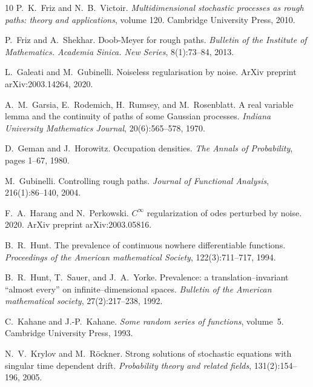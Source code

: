\documentclass[10pt]{article}
\newcommand{\tmtextit}[1]{{\itshape{#1}}}
\begin{document}
\begin{thebibliography}{10}
  P.~K.~Friz  and  N.~B.~Victoir.
  {\newblock}\tmtextit{Multidimensional stochastic processes as rough paths:
  theory and applications},  volume  120. {\newblock}Cambridge University
  Press, 2010.{\newblock}
  
  P.~Friz  and  A.~Shekhar. {\newblock}Doob-Meyer
  for rough paths. {\newblock}\tmtextit{Bulletin of the Institute of
  Mathematics. Academia Sinica. New Series}, 8(1):73--84, 2013.{\newblock}
  
  L.~Galeati  and  M.~Gubinelli.
  {\newblock}Noiseless regularisation by noise. {\newblock}ArXiv preprint
  arXiv:2003.14264, 2020.{\newblock}
  
  A.~M.~Garsia, E.~Rodemich, H.~Rumsey, and 
  M.~Rosenblatt. {\newblock}A real variable lemma and the continuity of paths
  of some Gaussian processes. {\newblock}\tmtextit{Indiana University
  Mathematics Journal}, 20(6):565--578, 1970.{\newblock}
  
  D.~Geman  and  J.~Horowitz. {\newblock}Occupation
  densities. {\newblock}\tmtextit{The Annals of Probability},  pages  1--67,
  1980.{\newblock}
  
  M.~Gubinelli. {\newblock}Controlling rough paths.
  {\newblock}\tmtextit{Journal of Functional Analysis}, 216(1):86--140,
  2004.{\newblock}
  
  F.~A.~Harang  and  N.~Perkowski.
  {\newblock}$C^{\infty}$ regularization of odes perturbed by noise.
  {\newblock}2020. {\newblock}ArXiv preprint arXiv:2003.05816.{\newblock}
  
  B.~R.~Hunt. {\newblock}The prevalence of continuous
  nowhere differentiable functions. {\newblock}\tmtextit{Proceedings of the
  American mathematical Society}, 122(3):711--717, 1994.{\newblock}
  
  B.~R.~Hunt, T.~Sauer, and  J.~A.~Yorke.
  {\newblock}Prevalence: a translation--invariant ``almost every'' on
  infinite--dimensional spaces. {\newblock}\tmtextit{Bulletin of the American
  mathematical society}, 27(2):217--238, 1992.{\newblock}
  
  C.~Kahane  and  J.-P.~Kahane. {\newblock}\tmtextit{Some
  random series of functions},  volume~5. {\newblock}Cambridge University
  Press, 1993.{\newblock}
  
  N.~V.~Krylov  and  M.~R{\"o}ckner. {\newblock}Strong
  solutions of stochastic equations with singular time dependent drift.
  {\newblock}\tmtextit{Probability theory and related fields},
  131(2):154--196, 2005.{\newblock}
  

\end{thebibliography}
\end{document}
